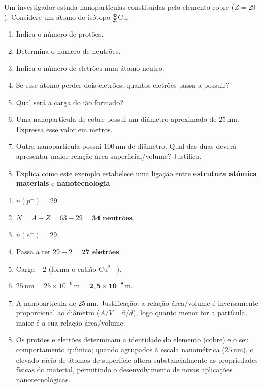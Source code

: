 \documentclass[11pt,a4paper]{article}
\begin{document}
	\begin{desafio}
		
		Um investigador estuda nanopartículas constituídas pelo elemento cobre (\(Z=29\)). Considere um átomo do isótopo \({}^{63}_{29}\mathrm{Cu}\).
		
		\begin{enumerate}[label=\alph*)]
			\item Indica o número de protões.
			\item Determina o número de neutrões.
			\item Indica o número de eletrões num átomo neutro.
			\item Se esse átomo perder dois eletrões, quantos eletrões passa a possuir?
			\item Qual será a carga do ião formado?
			\item Uma nanopartícula de cobre possui um diâmetro aproximado de \(25\,\mathrm{nm}\). Expressa esse valor em metros.
			\item Outra nanopartícula possui \(100\,\mathrm{nm}\) de diâmetro. Qual das duas deverá apresentar maior relação área superficial/volume? Justifica.
			\item Explica como este exemplo estabelece uma ligação entre \textbf{estrutura atómica}, \textbf{materiais} e \textbf{nanotecnologia}.
		\end{enumerate}
		
		\begin{solucao}
			\begin{enumerate}[label=\alph*)]
				\item \(n(p^+) = 29\).
				\item \(N = A - Z = 63 - 29 = \mathbf{34\text{ neutrões}}\).
				\item \(n(e^-) = 29\).
				\item Passa a ter \(29 - 2 = \mathbf{27\text{ eletrões}}\).
				\item Carga \textbf{\(+2\)} (forma o catião \(\mathrm{Cu}^{2+}\)).
				\item \(25\,\mathrm{nm} = 25 \times 10^{-9}\,\mathrm{m} = \mathbf{2,5 \times 10^{-8}\,\mathrm{m}}\).
				\item A nanopartícula de \textbf{\(25\,\mathrm{nm}\)}. Justificação: a relação área/volume é inversamente proporcional ao diâmetro (\(A/V = 6/d\)), logo quanto menor for a partícula, maior é a sua relação área/volume.
				\item Os protões e eletrões determinam a identidade do elemento (cobre) e o seu comportamento químico; quando agrupados à escala nanométrica (\(25\,\mathrm{nm}\)), o elevado rácio de átomos de superfície altera substancialmente as propriedades físicas do material, permitindo o desenvolvimento de novas aplicações nanotecnológicas.
			\end{enumerate}
		\end{solucao}
		
	\end{desafio}
	
\end{document}
